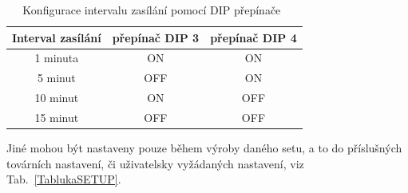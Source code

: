 \begin{table}[!ht]
\centering
\caption{Konfigurace intervalu zasílání pomocí DIP přepínače~\cite{CidloWeptech}}
\label{TablukaDIP}
\begin{tabular}{|c|c|c|}
\hline
\textbf{Interval zasílání} & přepínač DIP 3 & přepínač DIP 4 \\ \hline \hline
1 minuta & ON & ON \\ \hline
5 minut & OFF & ON \\ \hline
10 minut & ON & OFF \\ \hline
15 minut & OFF & OFF \\ \hline \hline
\end{tabular}
\end{table}

Jiné mohou být nastaveny pouze během výroby daného setu, a to do příslušných továrních nastavení, či uživatelsky vyžádaných nastavení, viz Tab.~\ref{TablukaSETUP}.

